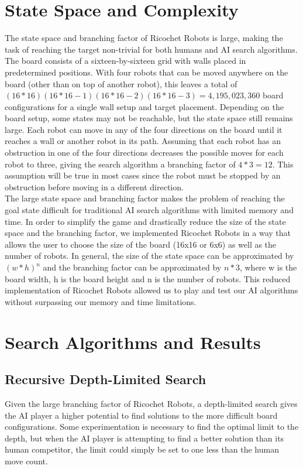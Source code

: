 \documentclass[a4paper,10pt]{article}
\begin{document}
\section{State Space and Complexity}
\label{sec:stateSpace}
The state space and branching factor of Ricochet Robots is large, making the task of reaching the target non-trivial for both humans and AI search algorithms.
The board consists of a sixteen-by-sixteen grid with walls placed in predetermined positions.  With four robots that can be moved anywhere on the board (other
than on top of another robot), this leaves a total of $(16*16)(16*16-1)(16*16-2)(16*16-3) = 4,195,023,360$ board configurations for a single wall setup and
target placement.  Depending on the board setup, some states may not be reachable, but the state space still remains large. Each robot can move in any of the
four directions on the board until it reaches a wall or another robot in its path.  Assuming that each robot has an obstruction in one of the four directions
decreases the possible moves for each robot to three, giving the search algorithm a branching factor of $4*3 = 12$.  This assumption will be true in most cases since
the robot must be stopped by an obstruction before moving in a different direction. \\

The large state space and branching factor makes the problem of reaching the goal state difficult for traditional AI search algorithms with limited memory and time.
In order to simplify the game and drastically reduce the size of the state space and the branching factor, we implemented Ricochet Robots in a way that allows the
user to choose the size of the board (16x16 or 6x6) as well as the number of robots. In general, the size of the state space can be approximated by $(w*h)^n$ and
the branching factor can be approximated by $n*3$, where w is the board width, h is the board height and n is the number of robots.  This reduced implementation of
Ricochet Robots allowed us to play and test our AI algorithms without surpassing our memory and time limitations.


\section{Search Algorithms and Results}



  \subsection{Recursive Depth-Limited Search} \label{recursiveDFS}
  Given the large branching factor of Ricochet Robots, a depth-limited search gives the AI player a higher potential to find solutions to the more difficult board configurations.  Some experimentation is necessary to find the optimal limit to the depth, but when the AI player is attempting to find a better solution than its human competitor, the limit could simply be set to one less than the human move count.  \\
\end{document}
